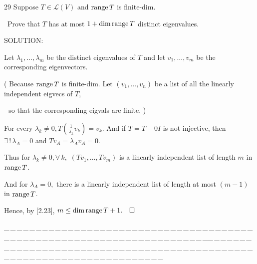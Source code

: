 \documentclass[a4paper, 11pt, UTF8]{article}
\def\range{\textup{range}\,}
\def\Lm{\mathcal{L}}
\begin{document}
\begin{large}
{\timesbf\Large 29} {\timessl\Large 
Suppose $T\in\Lm(V)$ and $\range T$ is finite-dim.}\par\quad\,
{\timessl\Large Prove that $T$ has at most $1 + \dim\range T$ distinct eigenvalues.
}\par
{\timesbf S\footnotesize{OLUTION:}}\par\quad
Let $\lambda_1,\dots,\lambda_m$ be the distinct eigenvalues of $T$ and let $v_1,\dots,v_m$ be the corresponding eigenvectors.\par\quad
( Because $\range T$ is finite-dim. Let $(v_1,\dots,v_n)$ be a list of all the linearly independent eigvecs of $T$,\par\quad\,\,
so that the corresponding eigvals are finite. )\par\quad
For every $\lambda_k\neq 0,T(\frac{1}{\lambda_k}v_k)=v_k.$ And if $T=T-0I$ is not injective, then $\exists\,!\,\lambda_A=0$ and $Tv_A=\lambda_A v_A=0.$\par\quad
Thus for $\lambda_k\neq 0,\forall\,k,$ $(Tv_1,\dots,Tv_m)$ is a linearly independent list of length $m$ in $\range T$.\par\quad
And for $\lambda_A=0,$ there is a linearly independent list  of length at most $(m-1)$ in $\range T$.\par\quad
Hence, by [2.23], $m\leq \dim\range T+1.\quad\square$\par
{\tiny \_\,\_\,\_\,\_\,\_\,\_\,\_\,\_\,\_\,\_\,\_\,\_\,\_\,\_\,\_\,\_\,\_\,\_\,\_\,\_\,\_\,\_\,\_\,\_\,\_\,\_\,\_\,\_\,\_\,\_\,\_\,\_\,\_\,\_\,\_\,\_\,\_\,\_\,\_\,\_\,\_\,\_\,\_\,\_\,\_\,\_\,\_\,\_\,\_\,\_\,\_\,\_\,\_\,\_\,\_\,\_\,\_\,\_\,\_\,\_\,\_\,\_\,\_\,\_\,\_\,\_\,\_\,\_\,\_\,\_\,\_\_\,\_\,\_\,\_\,\_\,\_\,\_\,\_\,\_\,\_\,\_\,\_\,\_\,\_\,\_\,\_\,\_\,\_\,\_\,\_\,\_\,\_\,\_\,\_\,\_\,\_\,\_\,\_\,\_\,\_\,\_\,\_\,\_\,\_\,\_\,\_\,\_\,\_\,\_\,\_\,\_\,\_\,\_\,\_\,\_\,\_\,\_\,\_\,\_\,\_\,\_\,\_\,\_\,\_\,\_\,\_\,\_\,\_\,\_\,\_\,\_\,\_\,\_\,\_\,\_\,\_\,\_\,\_\,\_\,\_\,\_}\par


\end{large}
\end{document}
